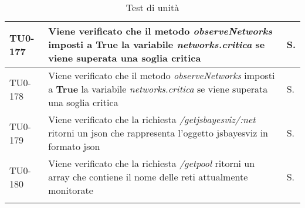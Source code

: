 \begin{longtable}{|C{.15\textwidth}|m{.66\textwidth}|C{.10\textwidth}|}
\hline
{}TU0-177 & Viene verificato che il metodo \textit{observeNetworks} imposti a \textbf{True} la variabile \textit{networks.critica} se viene superata una soglia critica & S.\\
\hline
TU0-178 & Viene verificato che il metodo \textit{observeNetworks} imposti a \textbf{True} la variabile \textit{networks.critica} se viene superata una soglia critica & S.\\
\hline
{}TU0-179 & Viene verificato che la richiesta \textit{/getjsbayesviz/:net} ritorni un json che rappresenta l'oggetto jsbayesviz in formato json & S.\\
\hline
TU0-180 & Viene verificato che la richiesta \textit{/getpool} ritorni un array che contiene il nome delle reti attualmente monitorate & S.\\
\hline
\caption{Test di unità}


\label{testunita}
\end{longtable}



